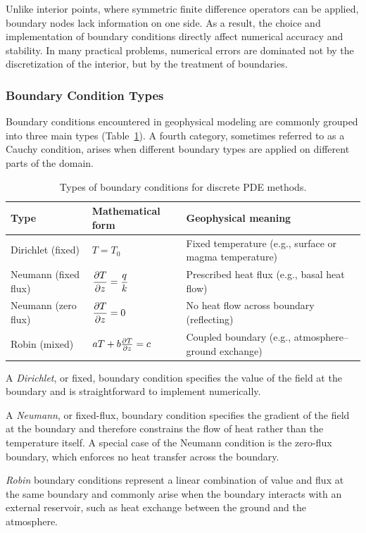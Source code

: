 Unlike interior points, where symmetric finite difference operators can be applied, boundary nodes lack information on one side. As a result, the choice and implementation of boundary conditions directly affect numerical accuracy and stability. In many practical problems, numerical errors are dominated not by the discretization of the interior, but by the treatment of boundaries.

\subsubsection{Boundary Condition Types}

Boundary conditions encountered in geophysical modeling are commonly grouped into three main types (Table~\ref{tab:bc}). A fourth category, sometimes referred to as a Cauchy condition, arises when different boundary types are applied on different parts of the domain.
\begin{table}[htbp]
    \centering
    \caption{Types of boundary conditions for discrete PDE methods.}
    \label{tab:bc}
    \begin{tabularx}{0.75\textwidth}{llX}
    \toprule
    Type & Mathematical form & Geophysical meaning \\
    \midrule
    Dirichlet (fixed) & $T = T_0$ & Fixed temperature (e.g., surface or magma temperature) \\
    Neumann (fixed flux) & $\displaystyle \pdv{T}{z} = \frac{q}{k}$ & Prescribed heat flux (e.g., basal heat flow) \\
    Neumann (zero flux) & $\displaystyle \pdv{T}{z} = 0$ & No heat flow across boundary (reflecting) \\
    Robin (mixed) & $aT + b\pdv{T}{z} = c$ & Coupled boundary (e.g., atmosphere--ground exchange) \\
    \bottomrule
    \end{tabularx}
\end{table}

A \emph{Dirichlet}, or fixed, boundary condition specifies the value of the field at the boundary and is straightforward to implement numerically.

A \emph{Neumann}, or fixed-flux, boundary condition specifies the gradient of the field at the boundary and therefore constrains the flow of heat rather than the temperature itself. A special case of the Neumann condition is the zero-flux boundary, which enforces no heat transfer across the boundary.

\emph{Robin} boundary conditions represent a linear combination of value and flux at the same boundary and commonly arise when the boundary interacts with an external reservoir, such as heat exchange between the ground and the atmosphere.

